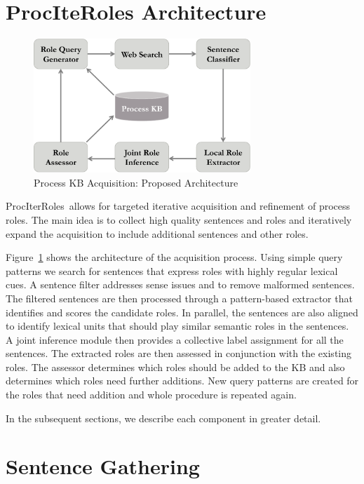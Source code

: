 \newcommand{\sys}{ProcIterRoles}

\section{ProcIteRoles Architecture}
\begin{figure}[hbt]
	\begin{center}
	\includegraphics[width=3.22in,height=1.99in]{figures/architecture.pdf} 	
	\caption{\label{fig:architecture} {Process KB Acquisition: Proposed Architecture}}
	\end{center}
\end{figure}
\sys\ allows for targeted iterative acquisition and refinement of process roles.
The main idea is to collect high quality sentences and roles and iteratively expand the acquisition to include
additional sentences and other roles. 

Figure~\ref{fig:architecture} shows the architecture of the acquisition process. 
Using simple query patterns we search for sentences that express roles with highly regular lexical cues. 
A sentence filter addresses sense issues and to remove malformed sentences.
The filtered sentences are then processed through a pattern-based extractor that identifies and scores the candidate roles. 
In parallel, the sentences are also aligned to identify lexical units that should play similar semantic roles in the sentences. 
A joint inference module then provides a collective label assignment for all the sentences. 
The extracted roles are then assessed in conjunction with the existing roles. 
The assessor determines which roles should be added to the KB and also determines which roles need further additions. 
New query patterns are created for the roles that need addition and whole procedure is repeated again. 

In the subsequent sections, we describe each component in greater detail.

\section{Sentence Gathering}

